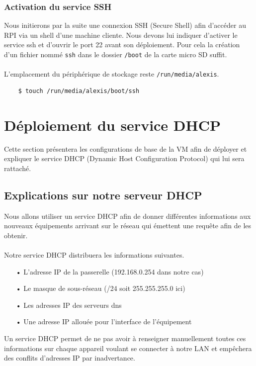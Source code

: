 \documentclass[a4paper]{article}
\begin{document}
\subsubsection{Activation du service SSH}
\indent Nous initierons par la suite une connexion SSH (Secure Shell) afin d'accéder au RPI via un shell d'une machine cliente. Nous devons lui indiquer d'activer le service ssh et d'ouvrir le port 22 avant son déploiement. Pour cela la création d'un fichier nommé \verb|ssh| dans le dossier \verb|/boot| de la carte micro SD suffit.\\\\L'emplacement du périphérique de stockage reste \verb|/run/media/alexis|.\\
\begin{lstlisting}
    $ touch /run/media/alexis/boot/ssh
\end{lstlisting}
\section{Déploiement du service DHCP}
Cette section présentera les configurations de base de la VM afin de déployer et expliquer le service DHCP (Dynamic Host Configuration Protocol) qui lui sera rattaché.
\subsection{Explications sur notre serveur DHCP}
Nous allons utiliser un service DHCP afin de donner différentes informations aux nouveaux équipements arrivant sur le réseau qui émettent une requête afin de les obtenir.\\\\Notre service DHCP distribuera les informations suivantes.
\begin{itemize}
    \item[•] L'adresse IP de la passerelle (192.168.0.254 dans notre cas)
    \item[•] Le masque de sous-réseau (/24 soit 255.255.255.0 ici)
    \item[•] Les adresses IP des serveurs dns
    \item[•] Une adresse IP allouée pour l'interface de l'équipement
\end{itemize}
Un service DHCP permet de ne pas avoir à renseigner manuellement toutes ces informations sur  chaque appareil voulant se connecter à notre LAN et empêchera des conflits d'adresses IP par inadvertance.
\end{document}
